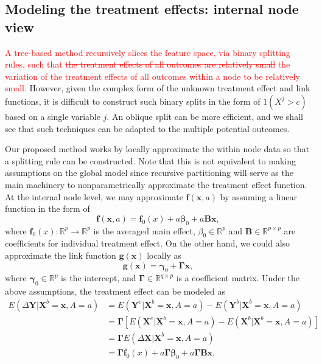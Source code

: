 \documentclass[smallextended]{svjour3}
\newcommand{\bg}[1]{\textcolor{red}{#1}}
\begin{document}
\subsection{Modeling the treatment effects: internal node view}\label{Meth}

\bg{A tree-based method recursively slices the feature space, via binary splitting rules, such that \st{the treatment effects of all outcomes are relatively small} the variation of the treatment effects of all outcomes within a node to be relatively small.} However, given the complex form of the unknown treatment effect and link functions, it is difficult to construct such binary splits \citep{breiman2001random} in the form of $1(X^{j} > c)$ based on a single variable $j$. An oblique split \citep{menze2011oblique} can be more efficient, and we shall see that such techniques can be adapted to the multiple potential outcomes. 

Our proposed method works by locally approximate the within node data so that a splitting rule can be constructed. Note that this is not equivalent to making assumptions on the global model since recursive partitioning will serve as the main machinery to nonparametrically approximate the treatment effect function. At the internal node level, we may approximate $\bm f(\bm x,a)$ by assuming a linear function in the form of
$$\bm f(\bm x,a) = \bm f_0(x) + a \boldsymbol \beta_0 + a\bm B \bm x,$$
where $\bm f_0(x): \mathbb{R}^p \rightarrow \mathbb{R}^p$ is the averaged main effect, $\beta_0 \in \mathbb{R}^p$ and $\bm B \in \mathbb{R}^{p \times p}$ are coefficients for individual treatment effect. On the other hand, we could also approximate the link function $\bm g(\bm x)$ locally as 
$$\bm g(\bm x)= \bm \gamma_0 + \bm \Gamma \bm x,$$
where $\bm \gamma_0 \in \mathbb{R}^p$ is the intercept, and $\bm \Gamma \in \mathbb{R}^{q\times p}$ is a coefficient matrix. Under the above assumptions, the treatment effect can be modeled as
\begin{align}
    E(\Delta \bm Y | \bm X^b = \bm x, A = a) &= E(\bm Y^e | \bm X^b = \bm x, A = a)-E(\bm Y^b | \bm X^b = \bm x, A = a) \nonumber\\
    &=\bm \Gamma \left[E(\bm X^e | \bm X^b=\bm x, A = a) - E(\bm X^b | \bm X^b=\bm x,A = a)\right]\nonumber\\
    &=\bm \Gamma E(\Delta \bm X | \bm X^b=\bm x, A = a)\nonumber\\
    &=\bm \Gamma \bm f_0(x) +  a  \bm \Gamma \boldsymbol \beta_0 + a \bm \Gamma \bm B \bm x. \label{eqn:changeofy}
\end{align} 
\end{document}
